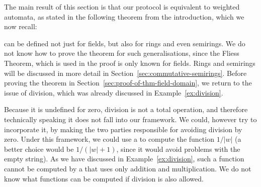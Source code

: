The main result of this section is that our protocol is equivalent to weighted automata, as stated in the following theorem from the introduction, which we now recall:
\fielddomain*


 can be defined not just for fields, but also for rings and
even semirings. We do not know how to prove the theorem for such
generalisations, since the Fliess Theorem, which is used in the proof is only
known for fields. Rings and semirings will be discussed in more detail in
Section~\ref{sec:commutative-semirings}. Before proving the theorem in
Section~\ref{sec:proof-of-thm-field-domain}, we return to the issue of
division, which was already discussed in Example~\ref{ex:division}.

\begin{myexample}\label{ex:division-continued}
    Because it is undefined for zero, division is not a total operation, and
    therefore technically speaking it does not fall into our framework. We
    could, however try to incorporate it, by making the two parties responsible
    for avoiding division by zero. Under this framework, we could use a
     to compute the function $1/|w|$ (a better choice would be
    $1/(|w|+1)$, since it would avoid problems with the empty string). As we have
    discussed in Example~\ref{ex:division}, such a function cannot be computed
    by a  that uses only addition and multiplication. We do not know
    what functions can be computed if division is also allowed.
\end{myexample}




